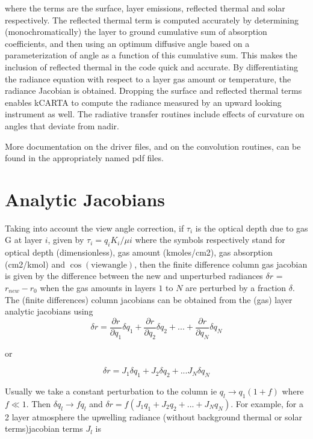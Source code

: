 \documentclass[11pt]{article}
\begin{document}
where the terms are the surface, layer emissions, reflected thermal and
solar respectively. The reflected thermal term is computed accurately by
determining (monochromatically) the layer to ground cumulative sum of
absorption coefficients, and then using an optimum diffusive angle based
on a parameterization of angle as a function of this cumulative sum.
This makes the inclusion of reflected thermal in the code quick and
accurate. By differentiating the radiance equation with respect to a
layer gas amount or temperature, the radiance Jacobian is obtained.
Dropping the surface and reflected thermal terms enables kCARTA to
compute the radiance measured by an upward looking instrument as well.
The radiative transfer routines include effects of curvature on angles
that deviate from nadir.

More documentation on the driver files, and on the convolution routines,
can be found in the appropriately named pdf files.

\section{Analytic Jacobians}
\label{sec-3}

Taking into account the view angle correction, if $\tau_{i}$ is the
optical depth due to gas G at layer $i$, given by
$\tau_{i} = q_{i} K_{i}/\mu{i}$ where the symbols respectively stand for
optical depth (dimensionless), gas amount (kmoles/cm2), gas absorption
(cm2/kmol) and $\cos(\mathrm{view angle})$, then the finite difference
column gas jacobian is given by the difference between the new and
unperturbed radiances $\delta r$ = $r_{new} - r_{0}$ when the gas
amounts in layers $1$ to $N$ are perturbed by a fraction $\delta$. The
(finite differences) column jacobians can be obtained from the (gas)
layer analytic jacobians using
$$\delta r = \frac{\partial r}{\partial q_1} \delta q_1 + 
           \frac{\partial r}{\partial q_2} \delta q_2 + ... + 
           \frac{\partial r}{\partial q_N} \delta q_N$$

or

$$\delta r = J_{1} \delta q_1 + J_{2} \delta q_2 + ...
               J_{N} \delta q_N$$ 

Usually we take a constant
perturbation to the column ie $q_{l} \rightarrow 
q_{1}(1 + f)$ where $f \ll 1$. Then $\delta q_{l} \rightarrow f q_{l}$
and $\delta r = f(J_{1} q_1 + J_{2} q_2 + ... + J_{N} q_N )$. For
example, for a 2 layer atmosphere the upwelling radiance (without
background thermal or solar terms)jacobian terms $J_{l}$ is
\end{document}
